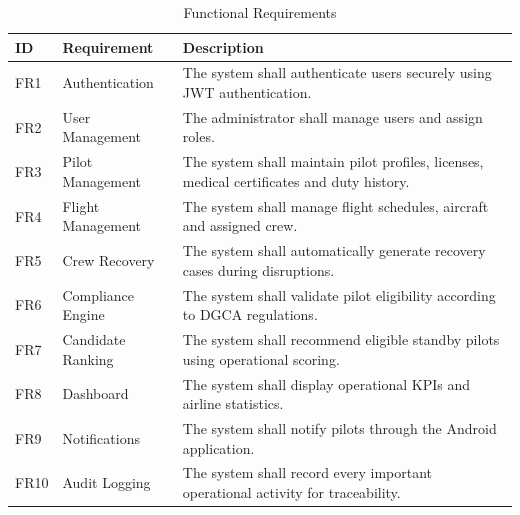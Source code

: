 \documentclass[12pt,a4paper]{report}
\begin{document}
\begin{table}[H]
\centering
\caption{Functional Requirements}

\begin{tabular}{|p{2cm}|p{4cm}|p{8cm}|}
\hline

\textbf{ID} &
\textbf{Requirement} &
\textbf{Description}\\

\hline

FR1 &
Authentication &
The system shall authenticate users securely using JWT authentication.\\

\hline

FR2 &
User Management &
The administrator shall manage users and assign roles.\\

\hline

FR3 &
Pilot Management &
The system shall maintain pilot profiles, licenses, medical certificates and duty history.\\

\hline

FR4 &
Flight Management &
The system shall manage flight schedules, aircraft and assigned crew.\\

\hline

FR5 &
Crew Recovery &
The system shall automatically generate recovery cases during disruptions.\\

\hline

FR6 &
Compliance Engine &
The system shall validate pilot eligibility according to DGCA regulations.\\

\hline

FR7 &
Candidate Ranking &
The system shall recommend eligible standby pilots using operational scoring.\\

\hline

FR8 &
Dashboard &
The system shall display operational KPIs and airline statistics.\\

\hline

FR9 &
Notifications &
The system shall notify pilots through the Android application.\\

\hline

FR10 &
Audit Logging &
The system shall record every important operational activity for traceability.\\

\hline

\end{tabular}

\end{table}
\end{document}
